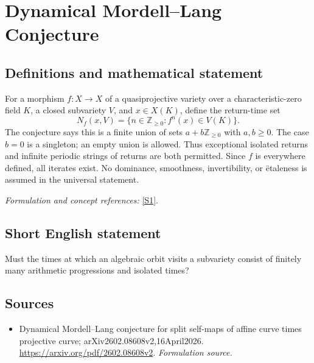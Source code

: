 \documentclass[11pt]{article}
\begin{document}
\section*{\texorpdfstring{Dynamical Mordell–Lang Conjecture}{Dynamical Mordell–Lang Conjecture}}\label{statement}
\subsection{Definitions and mathematical statement}
For a morphism $f:X\to X$ of a quasiprojective variety over a characteristic-zero field $K$, a closed subvariety $V$, and $x\in X(K)$, define the return-time set
\[
 N_f(x,V)=\{n\in{\mathbb{Z}}_{\ge0}:f^n(x)\in V(K)\}.
\]
The conjecture says this is a finite union of sets $a+b{\mathbb{Z}}_{\ge0}$ with $a,b\ge0$. The case $b=0$ is a singleton; an empty union is allowed. Thus exceptional isolated returns and infinite periodic strings of returns are both permitted. Since $f$ is everywhere defined, all iterates exist. No dominance, smoothness, invertibility, or \"etaleness is assumed in the universal statement.
\par\smallskip\textit{Formulation and concept references:} \href{https://arxiv.org/pdf/2602.08608v2}{[S1]}.

\subsection{Short English statement}
Must the times at which an algebraic orbit visits a subvariety consist of finitely many arithmetic progressions and isolated times?
\subsection{Sources}
\begin{itemize}
\item[S1]Dynamical Mordell–Lang conjecture for split self-maps of affine curve times projective curve; arXiv2602.08608v2,16April2026.
\url{https://arxiv.org/pdf/2602.08608v2}.
\textit{Formulation source.}
\end{itemize}
\end{document}
